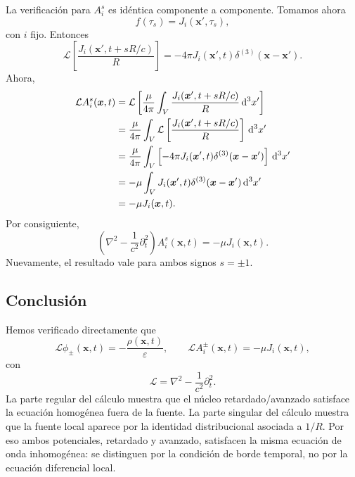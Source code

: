 \documentclass{article}
\numberwithin{equation}{section}
\newcommand{\dd}{\,\mathrm{d}}
\newcommand{\x}{\bm{x}}
\newcommand{\xp}{\bm{x}'}
\newcommand{\R}{R}
\newcommand{\eps}{\varepsilon}
\newcommand{\Boxop}{\mathcal{L}}
\begin{document}
La verificación para \(A_i^s\) es idéntica componente a componente. Tomamos ahora
\begin{equation}
    f(\tau_s)=J_i(\xp,\tau_s),
    \label{eq:f_J}
\end{equation}
con \(i\) fijo. Entonces
\begin{equation}
    \Boxop\left[\frac{J_i(\xp,t+s\R/c)}{\R}\right]
    =-4\pi J_i(\xp,t)\delta^{(3)}(\x-\xp).
    \label{eq:J_kernel_identity}
\end{equation}
Ahora,
\begin{align}
    \Boxop A_i^s(\x,t)
    &=\Boxop\left[
    \frac{\mu}{4\pi}
    \int_V\frac{J_i(\xp,t+s\R/c)}{\R}\dd^3x'
    \right] \notag\\
    &=\frac{\mu}{4\pi}
    \int_V
    \Boxop\left[\frac{J_i(\xp,t+s\R/c)}{\R}\right]
    \dd^3x' \notag\\
    &=\frac{\mu}{4\pi}
    \int_V
    \left[-4\pi J_i(\xp,t)\delta^{(3)}(\x-\xp)\right]
    \dd^3x' \notag\\
    &=-\mu\int_V J_i(\xp,t)\delta^{(3)}(\x-\xp)\dd^3x' \notag\\
    &=-\mu J_i(\x,t).
    \label{eq:A_substitution}
\end{align}
Por consiguiente,
\begin{equation}
    \boxed{
    \left(\nabla^2-\frac{1}{c^2}\partial_t^2\right)A_i^s(\x,t)
    =-\mu J_i(\x,t)}.
    \label{eq:A_final}
\end{equation}
Nuevamente, el resultado vale para ambos signos \(s=\pm 1\).

\subsection{Conclusión}

Hemos verificado directamente que
\begin{equation*}
    \Boxop\phi_\pm(\x,t)=-\frac{\rho(\x,t)}{\eps},
    \qquad
    \Boxop A_i^\pm(\x,t)=-\mu J_i(\x,t),
\end{equation*}
con
\begin{equation*}
    \Boxop=\nabla^2-\frac{1}{c^2}\partial_t^2.
\end{equation*}
La parte regular del cálculo muestra que el núcleo retardado/avanzado satisface la ecuación homogénea fuera de la fuente. La parte singular del cálculo muestra que la fuente local aparece por la identidad distribucional asociada a \(1/\R\). Por eso ambos potenciales, retardado y avanzado, satisfacen la misma ecuación de onda inhomogénea: se distinguen por la condición de borde temporal, no por la ecuación diferencial local.
\end{document}
